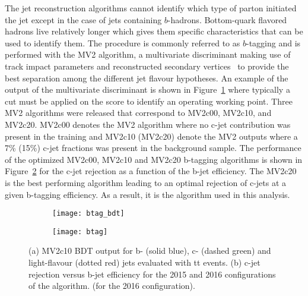 The jet reconstruction algorithms cannot identify which type of parton initiated the jet except in the case of 
jets containing $b$-hadrons. 
Bottom-quark flavored hadrons live relatively longer which gives them specific characteristics that can be used 
to identify them. The procedure is commonly referred to as $b$-tagging and
is performed with the MV2 algorithm, a multivariate discriminant making 
use of track impact parameters 
and reconstructed secondary vertices~\cite{Aad:2015ydr,ATL-PHYS-PUB-2015-022}
to provide the best separation among the different jet flavour hypotheses.
An example of the output of the multivariate discriminant is shown in Figure~\ref{fig:exp.btag.bdt} 
where typically a cut must be applied on the score to identify an operating working point. 
Three MV2 algorithms were released that correspond to MV2c00, MV2c10, and 
MV2c20.
MV2c00 denotes the MV2 algorithm where no c-jet contribution was present in the training and MV2c10 (MV2c20) denote the MV2 outputs where a 7\% (15\%) c-jet fractions was present 
in the background sample.
The performance of the optimized  MV2c00, MV2c10 and MV2c20 b-tagging algorithms is shown in Figure~\ref{fig:exp.btag.eff}
for the c-jet rejection as a function of the b-jet efficiency.
The MV2c20 is the best performing algorithm leading to an optimal rejection of c-jets at a given b-tagging 
efficiency. As a result, it is the algorithm used in this analysis.


\begin{figure}[htb!]
\centering
\begin{subfigure}[t]{0.48\textwidth}
\texttt{[image: btag\_bdt]}
\subcaption{}
\label{fig:exp.btag.bdt}
\end{subfigure}
\begin{subfigure}[t]{0.48\textwidth}
\texttt{[image: btag]}
\subcaption{}
\label{fig:exp.btag.eff}
\end{subfigure}
\vspace{-0.25cm}
\caption{
(a) MV2c10 BDT output for b- (solid blue), c- (dashed green) and light-flavour (dotted red) jets evaluated with tt events. 
(b) c-jet rejection versus b-jet efficiency for the 2015 and 2016 configurations of the algorithm.
 (for the 2016 configuration). 
}
\label{fig:exp.btag}
\end{figure} 


